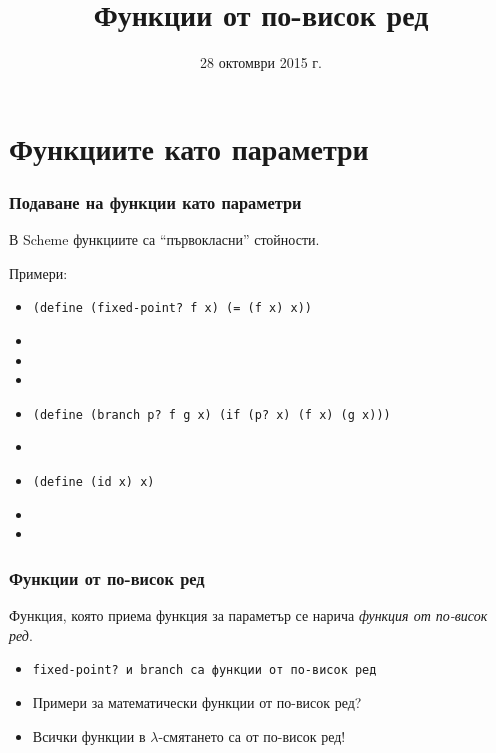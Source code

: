 \documentclass{beamer}
\title{Функции от по-висок ред}
\date{28 октомври 2015 г.}
\begin{document}
\begin{frame}
  \titlepage
\end{frame}

\section{Функциите като параметри}

\begin{frame}[fragile]
  \frametitle{Подаване на функции като параметри}

  В Scheme функциите са ``първокласни'' стойности.
  \vspace{1em}

  \pause

  Примери:
  \begin{itemize}[<+->]
  \item \verb#(define (fixed-point? f x) (= (f x) x))#
  \item {}
  \item {}
  \item {}
  \item {}
    {\tt{(define (branch p? f g x) (if (p? x) (f x) (g x)))}}
  \item {}
  \item \verb#(define (id x) x)#
  \item {}
  \item {}
  \end{itemize}

\end{frame}

\begin{frame}
  \frametitle{Функции от по-висок ред}

  \begin{definition}
    Функция, която приема функция за параметър се нарича \emph{функция от по-висок ред}.
  \end{definition}

  \pause

  \begin{itemize}[<+->]
  \item \tt{fixed-point?} и \tt{branch} са функции от по-висок ред
  \item \alert{Примери за математически функции от по-висок ред?}
  \item Всички функции в $\lambda$-смятането са от по-висок ред!
  \end{itemize}
\end{frame}
\end{document}
